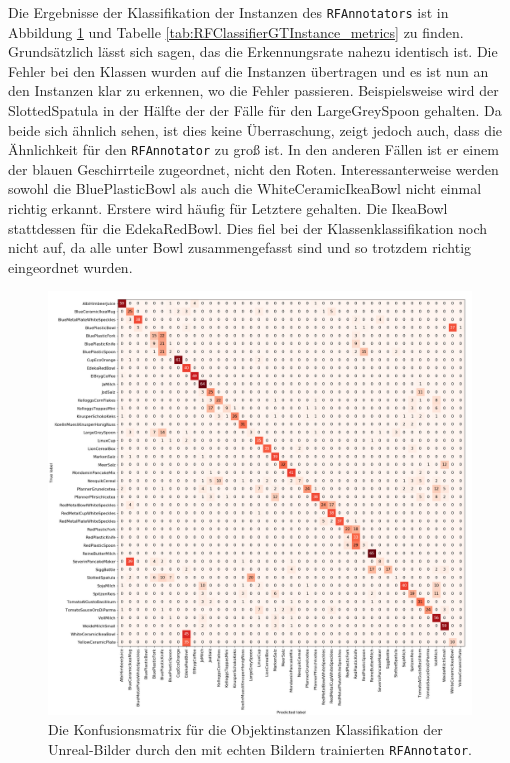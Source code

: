 Die Ergebnisse der Klassifikation der Instanzen des \texttt{RFAnnotators} ist in Abbildung \ref{fig:RFClassifierGTInstance_confMatrix} und Tabelle \ref{tab:RFClassifierGTInstance_metrics} zu finden. Grundsätzlich lässt sich sagen, das die Erkennungsrate nahezu identisch ist. Die Fehler bei den Klassen wurden auf die Instanzen übertragen und es ist nun an den Instanzen klar zu erkennen, wo die Fehler passieren. Beispielsweise wird der SlottedSpatula in der Hälfte der der Fälle für den LargeGreySpoon gehalten. Da beide sich ähnlich sehen, ist dies keine Überraschung, zeigt jedoch auch, dass die Ähnlichkeit für den \texttt{RFAnnotator} zu groß ist. In den anderen Fällen ist er einem der blauen Geschirrteile zugeordnet, nicht den Roten. \newline
Interessanterweise werden sowohl die BluePlasticBowl als auch die WhiteCeramicIkeaBowl nicht einmal richtig erkannt. Erstere wird häufig für Letztere gehalten. Die IkeaBowl stattdessen für die EdekaRedBowl. Dies fiel bei der Klassenklassifikation noch nicht auf, da alle unter Bowl zusammengefasst sind und so trotzdem richtig eingeordnet wurden.   

\begin{figure}
	\includegraphics[scale=.4]{img/chapter6/RFClassifierGTInstance.png}
\caption[Konfusionsmatrix der Klassifizierung der Objektinstanzen durch den RFAnnotator]{Die Konfusionsmatrix für die Objektinstanzen Klassifikation der Unreal-Bilder durch den mit echten Bildern trainierten \texttt{RFAnnotator}.}
\label{fig:RFClassifierGTInstance_confMatrix}
\end{figure}

